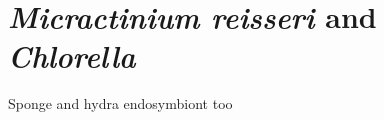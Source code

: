 



%
%
%
%
%
%
%
%



\section{\textit{Micractinium reisseri} and \textit{Chlorella}}
Sponge and hydra endosymbiont too

